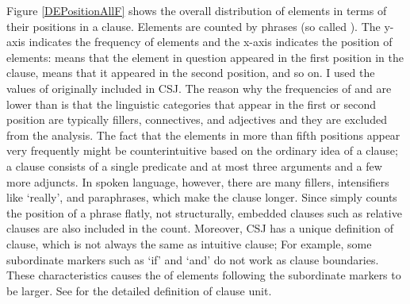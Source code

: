 Figure \ref{DEPositionAllF} shows the overall distribution of elements
in terms of their positions in a clause.
Elements are counted by phrases (so called ).
The y-axis indicates the frequency of elements and
the x-axis indicates the position of elements:
 means that the element in question appeared in the first position in the clause,
 means that it appeared in the second position,
and so on.
I used the values of  originally included in CSJ.
The reason why the frequencies of  and  are lower than  is that
the linguistic categories that appear in the first or second position
are typically fillers, connectives, and adjectives and
they are excluded from the analysis.
The fact that the elements in more than fifth positions appear very frequently
might be counterintuitive based on the ordinary idea of a clause;
a clause consists of a single predicate and at most three arguments and a few more adjuncts.
In spoken language, however,
there are many fillers, intensifiers like  `really', and paraphrases,
which make the clause longer.
Since  simply counts the position of a phrase flatly, not structurally,
embedded clauses such as relative clauses are also included in the count.
Moreover,
CSJ has a unique definition of clause, which is not always the same as intuitive clause;
For example,
some subordinate markers such as  `if' and  `and' do not work as clause boundaries.
These characteristics causes the  of elements following the subordinate markers to be larger.
See  for the detailed definition of clause unit.

